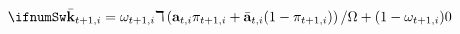 \begin{equation} \ifnumSw \label{eq:kBartp1i}
\bar{\mathbf{k}}_{t+1,i} =  \omega_{t+1,i} \daleth \left(\mathbf{a}_{t,i}\pi_{t+1,i}+\bar{\mathbf{a}}_{t,i}(1-\pi_{t+1,i})\right)/\Omega + (1-\omega_{t+1,i})0
\end{equation}

